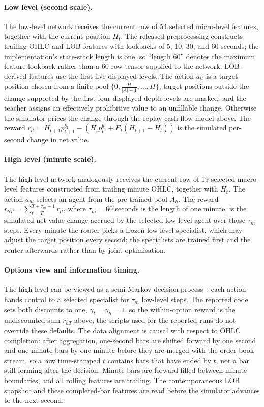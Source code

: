 \paragraph{Low level (second scale).} The low-level network receives the current row of 54 selected micro-level features, together with the current position $H_t$. The released preprocessing constructs trailing OHLC and LOB features with lookbacks of 5, 10, 30, and 60 seconds; the implementation's state-stack length is one, so ``length 60'' denotes the maximum feature lookback rather than a 60-row tensor supplied to the network. LOB-derived features use the first five displayed levels. The action $a_{lt}$ is a target position chosen from a finite pool $\{0,\frac{H}{|A|-1},\dots,H\}$; target positions outside the change supported by the first four displayed depth levels are masked, and the teacher assigns an effectively prohibitive value to an unfillable change. Otherwise the simulator prices the change through the replay cash-flow model above. The reward $r_{lt}=H_{t+1}p_{t+1}^{b_1}-(H_t p_t^{b_1}+E_t(H_{t+1}-H_t))$ is the simulated per-second change in net value.

\paragraph{High level (minute scale).} The high-level network analogously receives the current row of 19 selected macro-level features constructed from trailing minute OHLC, together with $H_t$. The action $a_{ht}$ selects an agent from the pre-trained pool $A_h$. The reward $r_{hT}=\sum_{t=T}^{T+\tau_m-1}r_{lt}$, where $\tau_m=60$ seconds is the length of one minute, is the simulated net-value change accrued by the selected low-level agent over those $\tau_m$ steps. Every minute the router picks a frozen low-level specialist, which may adjust the target position every second; the specialists are trained first and the router afterwards rather than by joint optimisation.

\paragraph{Options view and information timing.} The high level can be viewed as a semi-Markov decision process~\cite{sutton1999between,pateria2021hierarchical}: each action hands control to a selected specialist for $\tau_m$ low-level steps. The reported code sets both discounts to one, $\gamma_l=\gamma_h=1$, so the within-option reward is the undiscounted sum $r_{hT}$ above; the scripts used for the reported runs do not override these defaults. The data alignment is causal with respect to OHLC completion: after aggregation, one-second bars are shifted forward by one second and one-minute bars by one minute before they are merged with the order-book stream, so a row time-stamped $t$ contains bars that have ended by $t$, not a bar still forming after the decision. Minute bars are forward-filled between minute boundaries, and all rolling features are trailing. The contemporaneous LOB snapshot and these completed-bar features are read before the simulator advances to the next second.

